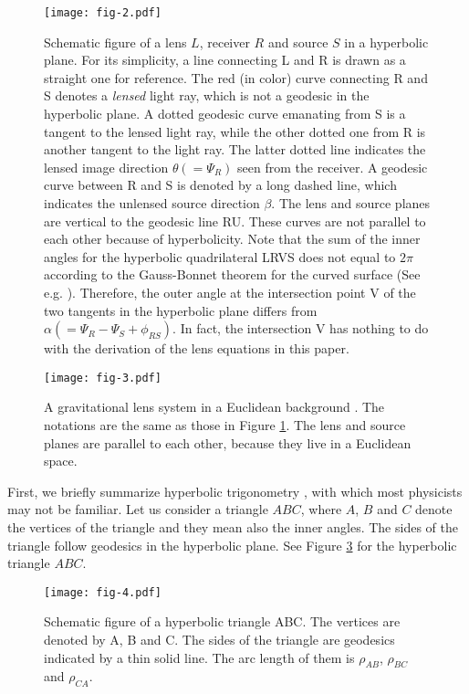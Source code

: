 \documentclass[twocolumn,showpacs,preprintnumbers,amsmath,amssymb]{revtex4-1}
\begin{document}
\begin{figure}
\texttt{[image: fig-2.pdf]}
\caption{
Schematic figure of a lens $L$, receiver $R$ and source $S$  
in a hyperbolic plane. 
For its simplicity, a line connecting L and R is drawn as a straight one 
for reference. 
The red (in color) curve connecting R and S denotes a {\it lensed} light ray, 
which is not a geodesic in the hyperbolic plane. 
A dotted geodesic curve emanating from S is a tangent 
to the lensed light ray, 
while the other dotted one from R is another tangent to the light ray. 
The latter dotted line indicates the lensed image direction 
$\theta (= \Psi_R)$ 
seen from the receiver. 
A geodesic curve between R and S is denoted by a long dashed line, 
which indicates the unlensed source direction $\beta$. 
The lens and source planes are vertical to the geodesic line RU. 
These curves are not parallel to each other 
because of hyperbolicity. 
Note that the sum of the inner angles for the hyperbolic quadrilateral 
LRVS does not equal to $2\pi$ according to the Gauss-Bonnet theorem 
for the curved surface (See e.g. \cite{Ishihara2016, Takizawa2020b}). 
Therefore, 
the outer angle at the intersection point V of the two tangents 
in the hyperbolic plane 
differs from 
$\alpha (= \Psi_R - \Psi_S + \phi_{RS})$. 
In fact, the intersection V has nothing to do with 
the derivation of the lens equations in this paper. 
}
\label{fig-config-h}
\end{figure}



\begin{figure}
\texttt{[image: fig-3.pdf]}
\caption{
A gravitational lens system in a Euclidean background 
\cite{Takizawa2020b}. 
The notations are the same as those in Figure \ref{fig-config-h}.  
The lens and source planes are parallel to each other, 
because they live in a Euclidean space. 
}
\label{fig-config-f}
\end{figure}



First, we briefly summarize hyperbolic trigonometry 
\cite{Anderson-book, Ratcliffe-book}, 
with which most physicists may not be familiar. 
Let us consider a triangle $ABC$, where $A$, $B$ and $C$ 
denote the vertices of the triangle and they mean also the inner angles. 
The sides of the triangle follow geodesics in the hyperbolic plane. 
See Figure \ref{fig-triangle-h} for the hyperbolic triangle $ABC$. 

\begin{figure}
\texttt{[image: fig-4.pdf]}
\caption{
Schematic figure of a hyperbolic triangle ABC. 
The vertices are denoted by A, B and C. 
The sides of the triangle are geodesics 
indicated by a thin solid line. 
The arc length of them is   
$\rho_{AB}$, $\rho_{BC}$ and $\rho_{CA}$. 
}
\label{fig-triangle-h}
\end{figure}
\end{document}
